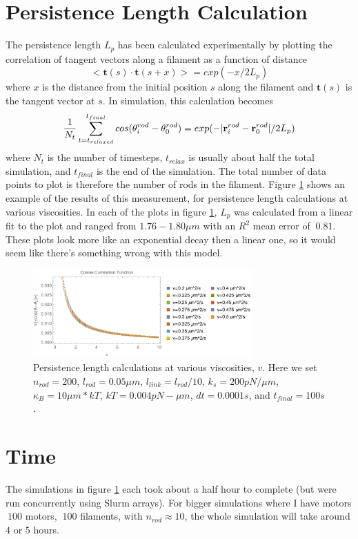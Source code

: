 \documentclass[11pt]{article}
\begin{document}
\section{Persistence Length Calculation}
The persistence length $L_p$ has been calculated experimentally by plotting the correlation of tangent vectors along a
filament as a function of distance \cite{ott}
\begin{equation}
  <\mathbf{t}(s)\cdot\mathbf{t}(s+x)>=exp(-x/2L_p)
  \label{eqn:pl}
\end{equation}
where $x$ is the distance from the initial position $s$ along the filament and $\mathbf{t}(s)$ is the tangent vector at $s$.
In simulation, this calculation becomes 
\begin{equation}
  {1\over N_t}\sum_{t=t_{relaxed}}^{t_{final}}{cos(\theta^{rod}_i -
  \theta^{rod}_0)}=exp(-|\mathbf{r}^{rod}_i-\mathbf{r}^{rod}_0|/2L_p)
  \label{eqn:pl_discrete}
\end{equation}
where $N_t$ is the number of timesteps, $t_{relax}$ is usually about half the total simulation, and $t_{final}$ is the
end of the simulation. The total number of data points to plot is therefore the number of rods in the filament. 
Figure \ref{fig:pl} shows an example of the results of this measurement, for persistence length calculations at various
viscosities. In each of the plots in figure \ref{fig:pl}, $L_p$ was calculated from a linear fit to the plot and ranged 
from $1.76 - 1.80 \mu m$ with an $R^2$ mean error of $~0.81$. These plots look more like an exponential decay then a
linear one, so it would seem like there's something wrong with this model.  
\begin{figure}[H]
  \centering
  \includegraphics[width=0.75\textwidth]{pl-calc-ccf.pdf}
\caption{Persistence length calculations at various viscosities, $v$. Here we set $n_{rod} = 200$, $l_{rod}=0.05 \mu m$, 
$l_{link} = l_{rod}/10$, $k_s = 200 pN/\mu m$, $\kappa_B = 10\mu m*kT$, $kT =
0.004 pN-\mu m$, $dt = 0.0001 s$, and $t_{final} = 100 s$. } 
  \label{fig:pl}
\end{figure}
\section{Time}
The simulations in figure \ref{fig:pl} each took about a half hour to complete (but were run concurrently using Slurm
arrays). For bigger simulations where I have motors $~100$ motors, $~100$ filaments, with $n_{rod}\approx 10$, the whole
simulation will take around $4$ or $5$ hours.


\end{document}
